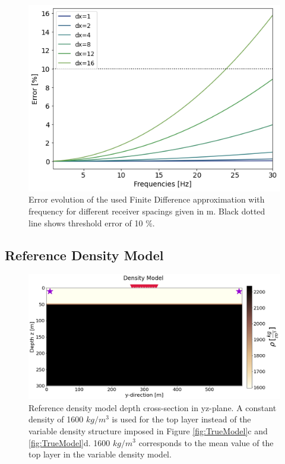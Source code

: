 \documentclass{article}
\begin{document}
	\begin{figure}[H]
		\centering
		\includegraphics[width =0.5\linewidth]{../Figures/error.png}
		\captionsetup{width=\linewidth}
		\caption{Error evolution of the used Finite Difference approximation with frequency for different receiver spacings given in m. Black dotted line shows threshold error of 10 $\%$.}
		\label{fig:error}
	\end{figure}
	
	\newpage
	
	\subsection{Reference Density Model} \label{sec:AppendixB}
	\renewcommand{\thefigure}{B\arabic{figure}}
	\setcounter{figure}{0} 
	\begin{figure}[H]
		\centering
		\includegraphics[width =0.65\linewidth]{../Figures/rho_constant.png}
		\captionsetup{width=\linewidth}
		\caption{Reference density model depth cross-section in yz-plane. A constant density of 1600 $kg/m^{3}$ is used for the top layer instead of the variable density structure imposed in Figure \ref{fig:TrueModel}c and \ref{fig:TrueModel}d. 1600 $kg/m^{3}$ corresponds to the mean value of the top layer in the variable density model.}
		\label{fig:cst_rho}
	\end{figure}\mbox{}
\end{document}
